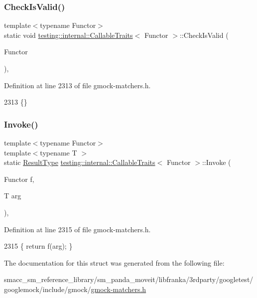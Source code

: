 \subsubsection{\texorpdfstring{Check\+Is\+Valid()}{CheckIsValid()}}
{\footnotesize\ttfamily template$<$typename Functor$>$ \\
static void \hyperlink{structtesting_1_1internal_1_1CallableTraits}{testing\+::internal\+::\+Callable\+Traits}$<$ Functor $>$\+::Check\+Is\+Valid (\begin{DoxyParamCaption}\item[{Functor}]{ }\end{DoxyParamCaption})\hspace{0.3cm}{\ttfamily [inline]}, {\ttfamily [static]}}



Definition at line 2313 of file gmock-\/matchers.\+h.


\begin{DoxyCode}
2313 \{\}
\end{DoxyCode}
\mbox{\label{structtesting_1_1internal_1_1CallableTraits_ad54471cad61aefbe15de330867ff5936}} 
\subsubsection{\texorpdfstring{Invoke()}{Invoke()}}
{\footnotesize\ttfamily template$<$typename Functor$>$ \\
template$<$typename T $>$ \\
static \hyperlink{structtesting_1_1internal_1_1CallableTraits_a242d198dd1c56a153ba931d7166ec7f3}{Result\+Type} \hyperlink{structtesting_1_1internal_1_1CallableTraits}{testing\+::internal\+::\+Callable\+Traits}$<$ Functor $>$\+::Invoke (\begin{DoxyParamCaption}\item[{Functor}]{f,  }\item[{T}]{arg }\end{DoxyParamCaption})\hspace{0.3cm}{\ttfamily [inline]}, {\ttfamily [static]}}



Definition at line 2315 of file gmock-\/matchers.\+h.


\begin{DoxyCode}
2315 \{ \textcolor{keywordflow}{return} f(arg); \}
\end{DoxyCode}


The documentation for this struct was generated from the following file\+:\begin{DoxyCompactItemize}
\item 
smacc\+\_\+sm\+\_\+reference\+\_\+library/sm\+\_\+panda\+\_\+moveit/libfranka/3rdparty/googletest/googlemock/include/gmock/\hyperlink{gmock-matchers_8h}{gmock-\/matchers.\+h}\end{DoxyCompactItemize}
